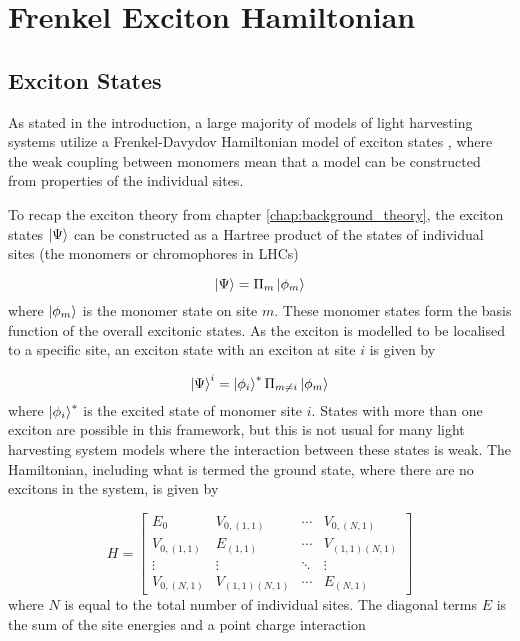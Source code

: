 \section{Frenkel Exciton Hamiltonian}
\label{sec:exciton_theory}

\subsection{Exciton States}
\label{subsec:exciton_states}
As stated in the introduction, a large majority of models of light harvesting systems
utilize a Frenkel-Davydov Hamiltonian model of exciton states \cite{Curutchet2016, Cignoni2022}, 
where the weak coupling between monomers mean that a model can be constructed from
properties of the individual sites.

To recap the exciton theory from chapter \ref{chap:background_theory}, the exciton 
states $\ket{\Psi}$ can be constructed as a Hartree product of the states of individual 
sites (the monomers or chromophores in LHCs)

\begin{equation}
    \ket{\Psi} = \Pi_m \ket{\phi_m}
\end{equation}
%
where $\ket{\phi_m}$ is the monomer state on site $m$. These monomer states form
the basis function of the overall excitonic states. As the exciton is modelled to
be localised to a specific site, an exciton state with an exciton at site $i$ is
given by

\begin{equation}
    \ket{\Psi}^i = \ket{\phi_i}^\ast \Pi_{m \neq i}  \ket{\phi_m}
\end{equation}
%
where $\ket{\phi_i}^\ast$ is the excited state of monomer site $i$. States with 
more than one exciton are possible in this framework, but this is not usual for 
many light harvesting system models where the interaction between these states is
weak. The Hamiltonian, including what is termed the ground state, where there are 
no excitons in the system, is given by

\begin{equation}
    H = 
    \begin{bmatrix}
        E_0 & V_{0, \left(1, 1\right)} & \cdots & V_{0, \left(N, 1\right)} \\
        V_{0, \left(1, 1\right)} & E_{\left(1,1\right)} & \cdots & V_{\left(1,1\right) \left(N, 1\right)} \\
        \vdots & \vdots & \ddots & \vdots \\
        V_{0, \left(N, 1\right)} & V_{\left(1,1\right) \left(N, 1\right)} & \cdots & E_{\left(N, 1\right)}
    \end{bmatrix}
    \label{eq:exciton_H_matrix}
\end{equation}
%
where $N$ is equal to the total number of individual sites. The diagonal terms $E$
is the sum of the site energies and a point charge interaction


